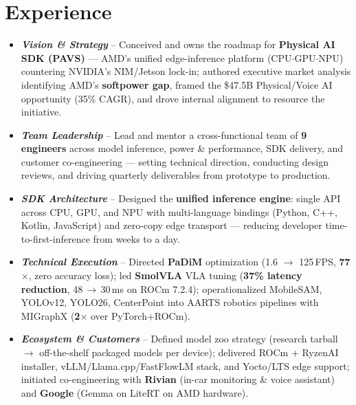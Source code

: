 \documentclass[11pt,a4paper,sans]{moderncv} %
\begin{document}
\section{Experience}
{\begin{itemize}[noitemsep]
    \item[\tiny $\bullet$] {\textbf{\textit{Vision \& Strategy}} – Conceived and owns the roadmap for \textbf{Physical AI SDK (PAVS)} — AMD's unified edge-inference platform (CPU$\cdot$GPU$\cdot$NPU) countering NVIDIA's NIM/Jetson lock-in; authored executive market analysis identifying AMD's \textbf{softpower gap}, framed the \$47.5B Physical/Voice AI opportunity (35\% CAGR), and drove internal alignment to resource the initiative.}
    \item[\tiny $\bullet$] {\textbf{\textit{Team Leadership}} – Lead and mentor a cross-functional team of \textbf{9 engineers} across model inference, power \& performance, SDK delivery, and customer co-engineering — setting technical direction, conducting design reviews, and driving quarterly deliverables from prototype to production.}
    \item[\tiny $\bullet$] {\textbf{\textit{SDK Architecture}} – Designed the \textbf{unified inference engine}: single API across CPU, GPU, and NPU with multi-language bindings (Python, C++, Kotlin, JavaScript) and zero-copy edge transport — reducing developer time-to-first-inference from weeks to a day.}
    \item[\tiny $\bullet$] {\textbf{\textit{Technical Execution}} – Directed \textbf{PaDiM} optimization (1.6 $\to$ 125\,FPS, \textbf{77$\times$}, zero accuracy loss); led \textbf{SmolVLA} VLA tuning (\textbf{37\% latency reduction}, 48\,$\to$\,30\,ms on ROCm 7.2.4); operationalized MobileSAM, YOLOv12, YOLO26, CenterPoint into AARTS robotics pipelines with MIGraphX (\textbf{2$\times$} over PyTorch+ROCm).}
    \item[\tiny $\bullet$] {\textbf{\textit{Ecosystem \& Customers}} – Defined model zoo strategy (research tarball $\to$ off-the-shelf packaged models per device); delivered ROCm + RyzenAI installer, vLLM/Llama.cpp/FastFlowLM stack, and Yocto/LTS edge support; initiated co-engineering with \textbf{Rivian} (in-car monitoring \& voice assistant) and \textbf{Google} (Gemma on LiteRT on AMD hardware).}
\end{itemize}}
\end{document}
